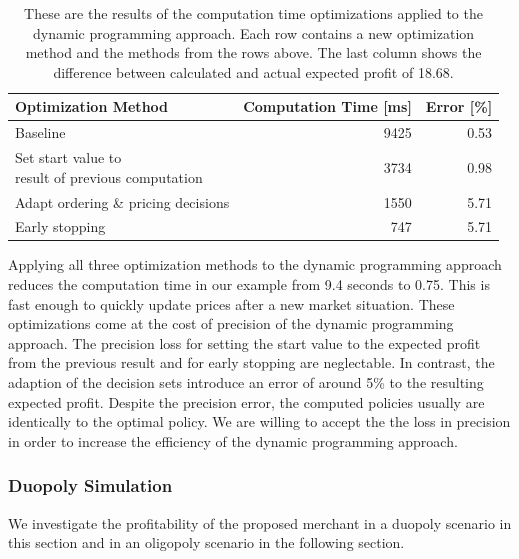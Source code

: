 \begin{table}[t]
	\centering
	\begin{tabular}{ lrr }
		\toprule
		Optimization Method & Computation Time [ms] & Error [\%] \\
		\midrule
		Baseline & 9425 & 0.53 \\
		\makecell[l]{Set start value to \\ result of previous computation} & 3734 & 0.98 \\
		Adapt ordering \& pricing decisions & 1550 & 5.71 \\
		Early stopping & 747 & 5.71\\
		\bottomrule
	\end{tabular}
	\caption{These are the results of the computation time optimizations applied to the dynamic programming approach.
	Each row contains a new optimization method and the methods from the rows above. The last column shows the difference between calculated and actual expected profit of 18.68.}
	\label{tab:speedup}
\end{table}

Applying all three optimization methods to the dynamic programming approach reduces the computation time in our example from 9.4 seconds to 0.75.
This is fast enough to quickly update prices after a new market situation.
These optimizations come at the cost of precision of the dynamic programming approach.
The precision loss for setting the start value to the expected profit from the previous result and for early stopping are neglectable.
In contrast, the adaption of the decision sets introduce an error of around 5\% to the resulting expected profit.
Despite the precision error, the computed policies usually are identically to the optimal policy.
We are willing to accept the the loss in precision in order to increase the efficiency of the dynamic programming approach.

\subsubsection{Duopoly Simulation}
We investigate the profitability of the proposed merchant in a duopoly scenario in this section and in an oligopoly scenario in the following section.


